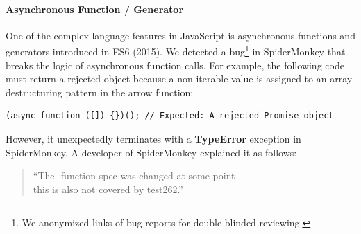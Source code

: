 \paragraph{\textbf{Asynchronous Function / Generator}}
One of the complex language features in JavaScript is asynchronous functions and
generators introduced in ES6 (2015).
%
We detected a bug\footnote{
  We anonymized links of bug reports for double-blinded reviewing.
} in SpiderMonkey that breaks the logic of asynchronous function calls.
%
For example, the following code must return a rejected  object
because a non-iterable value  is assigned to an array
destructuring pattern \jscode{[]} in the  arrow function:
%
\begin{lstlisting}[style=JS, basicstyle=\footnotesize\ttfamily]
    (async function ([]) {})(); // Expected: A rejected Promise object
\end{lstlisting}
However, it unexpectedly terminates with a \textbf{TypeError} exception in SpiderMonkey.
A developer of SpiderMonkey explained it as follows:
\begin{quote}
``The -function spec was changed at some point \textelp{}\\
this is also not covered by test262.''
\end{quote}
%


